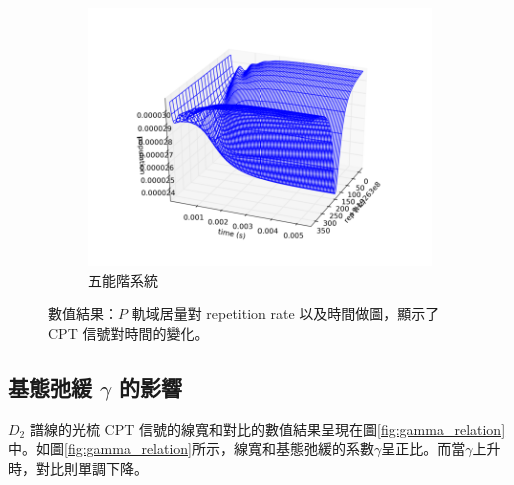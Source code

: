 \documentclass[11pt,a4paper]{article}
\begin{document}
\begin{figure}[H]
\begin{subfigure}[b]{0.3\textwidth}
 \includegraphics[width=\textwidth]{small_system/five_level_1000.pdf}
 \caption{五能階系統}
 \label{fig:five_level_result}
 \end{subfigure}
 \caption{數值結果：$P$ 軌域居量對 repetition rate 以及時間做圖，顯示了 CPT 信號對時間的變化。}
 \label{fig:small_system_result}
 \end{figure}

 \subsection{基態弛緩 $\gamma$ 的影響}
$D_2$ 譜線的光梳 CPT 信號的線寬和對比的數值結果呈現在圖\ref{fig:gamma_relation}中。如圖\ref{fig:gamma_relation}所示，線寬和基態弛緩的系數$\gamma$呈正比。而當$\gamma$上升時，對比則單調下降。
\end{document}
